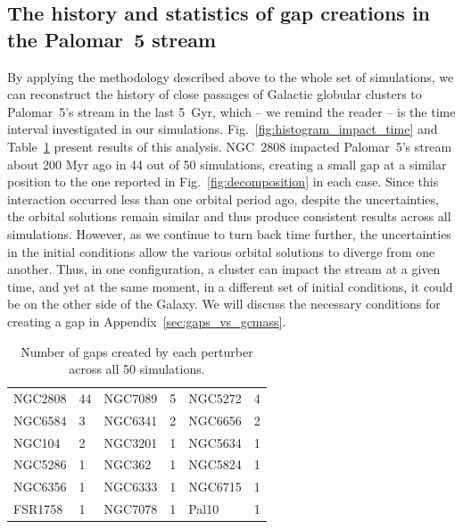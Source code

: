     \subsection{The history and statistics of gap creations in the Palomar~5 stream}\label{sect:history}
        By applying the methodology described above to the whole set of simulations, we can reconstruct the history of close passages of Galactic globular clusters to Palomar~5's stream in the last 5~Gyr, which -- we remind the reader -- is the time interval investigated in our simulations.  Fig.~\ref{fig:histogram_impact_time} and Table~\ref{tab:gaps_per_perturber} present results of this analysis. NGC~2808 impacted Palomar~5's stream about 200 Myr ago in 44 out of 50 simulations, creating a small gap at a similar position to the one reported in Fig.~\ref{fig:decomposition} in each case. Since this interaction occurred less than one orbital period ago, despite the uncertainties, the orbital solutions remain similar and thus produce consistent results across all simulations. However, as we continue to turn back time further, the uncertainties in the initial conditions allow the various orbital solutions to diverge from one another. Thus, in one configuration, a cluster can impact the stream at a given time, and yet at the same moment, in a different set of initial conditions, it could be on the other side of the Galaxy. We will discuss the necessary conditions for creating a gap in Appendix~\ref{sec:gaps_vs_gcmass}. 
        \begin{table}[h]
            \centering
            \caption{Number of gaps created by each perturber across all 50 simulations.}
            \label{tab:gaps_per_perturber}
            \begin{tabular}{|ll|ll|ll|}
            \hline
            NGC2808 & 44 & NGC7089 & 5 & NGC5272 & 4 \\
            NGC6584 & 3 & NGC6341 & 2 & NGC6656 & 2 \\
            NGC104 & 2 & NGC3201 & 1 & NGC5634 & 1 \\
            NGC5286 & 1 & NGC362 & 1 & NGC5824 & 1 \\
            NGC6356 & 1 & NGC6333 & 1 & NGC6715 & 1 \\
            FSR1758 & 1 & NGC7078 & 1 & Pal10 & 1 \\
            \hline
            \end{tabular}
        \end{table} 


